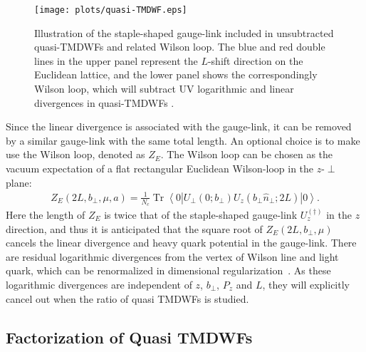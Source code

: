 \documentclass[prd,aps,twocolumn,preprintnumbers, showpacs, nofootinbib,superscriptaddress,notitlepage]{revtex4-1}
\begin{document}
\begin{figure}
\centering
\texttt{[image: plots/quasi-TMDWF.eps]}
\caption{Illustration of the staple-shaped gauge-link included in unsubtracted quasi-TMDWFs  and related Wilson loop. The blue and red double lines in the upper panel represent the $L$-shift direction on the Euclidean lattice, and the lower panel shows the correspondingly Wilson loop, which will subtract   UV logarithmic  and linear divergences in  quasi-TMDWFs . }
\label{fig:definitionofquasiTMDWF}
\end{figure}

Since the  linear divergence is associated with the gauge-link, it can be removed by a similar gauge-link with the same total length. An  optional choice  is to make use the Wilson loop,  denoted as $Z_E$. The Wilson loop can be chosen  as the vacuum expectation of a flat rectangular Euclidean Wilson-loop in the $z$-$\perp$ plane:
\begin{align}\label{eq:WilsonLoop}
Z_E\left(2L, b_{\perp}, \mu,a\right)=\frac{1}{N_{c}} \operatorname{Tr}\left\langle 0\left|U_{\perp}(0;b_{\perp}) U_{z}\left(b_{\perp}\hat{n}_{\perp}; 2L\right)\right| 0\right\rangle. 
\end{align}
Here  the length of $Z_E$ is twice that of the staple-shaped gauge-link $U_z^{(\dagger)}$ in the $z$ direction, and thus it is anticipated that the square root of $Z_E\left(2L, b_{\perp}, \mu\right)$ cancels the linear divergence and heavy quark potential in the gauge-link.  There are residual logarithmic divergences from the vertex of   Wilson line and light quark, which can be renormalized in dimensional regularization~\cite{Ji:2021uvr}. As these logarithmic divergences are independent of $z$, $b_{\perp}$, $P_{z}$ and $L$, they will explicitly cancel out when  the ratio of quasi TMDWFs is studied. 



\subsection{Factorization of Quasi TMDWFs}\label{sec:factorizationformula}
\end{document}
